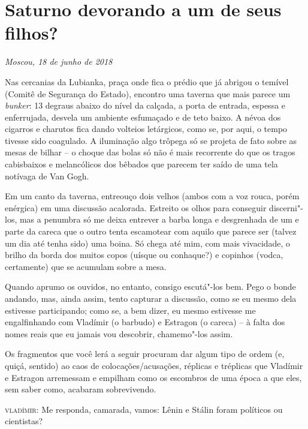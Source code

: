 \chapter*{Saturno devorando a um de seus filhos?}

\begin{flushright}
\emph{Moscou, 18 de junho de 2018}
\end{flushright}

Nas cercanias da Lubianka, praça onde fica o prédio que já abrigou o
temível  (Comitê de Segurança do Estado), encontro uma taverna que
mais parece um \emph{bunker}: 13 degraus abaixo do nível da calçada, a
porta de entrada, espessa e enferrujada, desvela um ambiente esfumaçado
e de teto baixo. A névoa dos cigarros e charutos fica dando volteios
letárgicos, como se, por aqui, o tempo tivesse sido coagulado. A
iluminação algo trôpega só se projeta de fato sobre as mesas de bilhar
-- o choque das bolas só não é mais recorrente do que os tragos
cabisbaixos e melancólicos dos bêbados que parecem ter saído de uma tela
notívaga de Van Gogh.

Em um canto da taverna, entreouço dois velhos (ambos com a voz rouca,
porém enérgica) em uma discussão acalorada. Estreito os olhos para
conseguir discerni"-los, mas a penumbra só me deixa entrever a barba
longa e desgrenhada de um e parte da careca que o outro tenta escamotear
com aquilo que parece ser (talvez um dia até tenha sido) uma boina. Só
chega até mim, com mais vivacidade, o brilho da borda dos muitos copos
(uísque ou conhaque?) e copinhos (vodca, certamente) que se acumulam
sobre a mesa.

Quando aprumo os ouvidos, no entanto, consigo escutá"-los bem. Pego o
bonde andando, mas, ainda assim, tento capturar a discussão, como se eu
mesmo dela estivesse participando; como se, a bem dizer, eu mesmo
estivesse me engalfinhando com Vladímir (o barbudo) e Estragon (o
careca) -- à falta dos nomes reais que eu jamais vou descobrir,
chamemo"-los assim.

Os fragmentos que você lerá a seguir procuram dar algum tipo de ordem
(e, quiçá, sentido) ao caos de colocações/acusações, réplicas e
tréplicas que Vladímir e Estragon arremessam e empilham como os
escombros de uma época a que eles, sem saber como, acabaram
sobrevivendo.

\textsc{vladímir:} Me responda, camarada, vamos: Lênin e Stálin foram
políticos ou cientistas?


